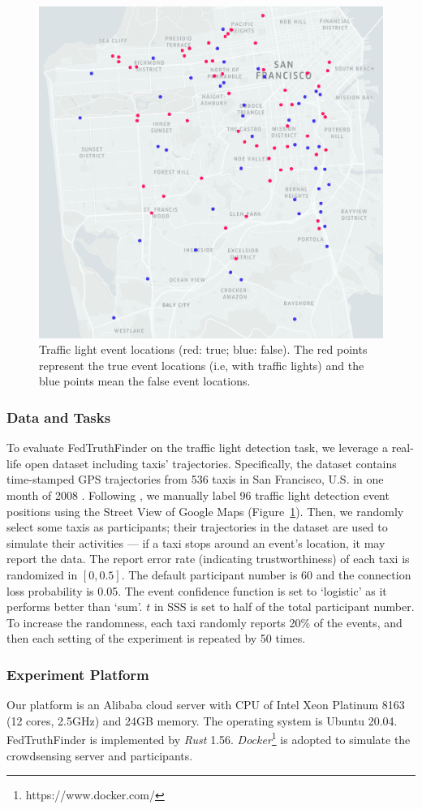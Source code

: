 \begin{figure}[t]
	\centering
	\includegraphics[width=.4\linewidth]{./fig/traffic_light_map.png}
	\caption{Traffic light event locations (red: true; blue: false). The red points represent the true event locations (i.e, with traffic lights) and the blue points mean the false event locations.}
	\label{fig:traffic_light_map}
\end{figure}

\subsubsection{Data and Tasks} To evaluate FedTruthFinder on the traffic light detection task, we leverage a real-life open dataset including taxis' trajectories. Specifically, the dataset contains time-stamped GPS trajectories from 536 taxis in San Francisco, U.S. in one month of 2008 \citep{epflmobility}. Following \citet{ouyang2015truth}, we manually label 96 traffic light detection event positions using the Street View of Google Maps (Figure~\ref{fig:traffic_light_map}). Then, we randomly select some taxis as participants; their trajectories in the dataset are used to simulate their activities --- if a taxi stops around an event's location, it may report the data. The report error rate (indicating trustworthiness) of each taxi is randomized in $[0,0.5]$. The default participant number is 60 and the connection loss probability is 0.05. The event confidence function is set to `logistic' as it performs better than `sum'. $t$ in SSS is set to half of the total participant number. To increase the randomness, each taxi randomly reports 20\% of the events, and then each setting of the experiment is repeated by 50 times.

\subsubsection{Experiment Platform} Our platform is an Alibaba cloud server with CPU of Intel Xeon Platinum 8163 (12 cores, 2.5GHz) and 24GB memory. The operating system is Ubuntu 20.04. FedTruthFinder is implemented by \textit{Rust} 1.56. \textit{Docker}\footnote{https://www.docker.com/} is adopted to simulate the crowdsensing server and participants.


